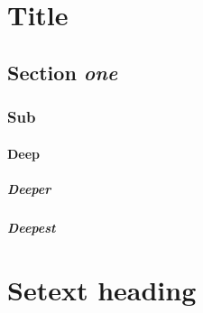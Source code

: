 \section{Title}

\subsection{Section \emph{one}}

\subsubsection{Sub}

\paragraph{Deep}

\subparagraph{Deeper}

\subparagraph{Deepest}

\section{Setext heading}
